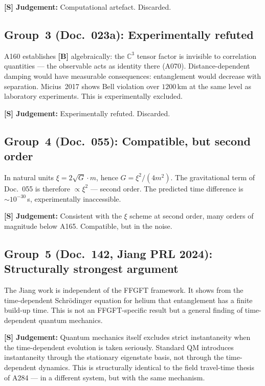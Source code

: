 \textbf{[S] Judgement:} Computational artefact. Discarded.

\subsection{Group~3 (Doc.~023a): Experimentally refuted}

A160 establishes \textbf{[B]} algebraically: the $\mathbb{C}^3$
tensor factor is invisible to correlation quantities --- the observable
acts as identity there (A070). Distance-dependent damping would have
measurable consequences: entanglement would decrease with separation.
Micius~2017 shows Bell violation over $1200$\,km at the same level
as laboratory experiments. This is experimentally excluded.

\textbf{[S] Judgement:} Experimentally refuted. Discarded.

\subsection{Group~4 (Doc.~055): Compatible, but second order}

In natural units $\xi = 2\sqrt{G}\cdot m$, hence $G = \xi^2/(4m^2)$.
The gravitational term of Doc.~055 is therefore $\propto \xi^2$ ---
second order. The predicted time difference is $\sim 10^{-30}$\,s,
experimentally inaccessible.

\textbf{[S] Judgement:} Consistent with the $\xi$ scheme at second order,
many orders of magnitude below A165. Compatible, but in the noise.

\subsection{Group~5 (Doc.~142, Jiang PRL 2024): Structurally strongest argument}

The Jiang work is independent of the FFGFT framework. It shows from the
time-dependent Schrödinger equation for helium that entanglement has a
finite build-up time. This is not an FFGFT-specific result but a general
finding of time-dependent quantum mechanics.

\textbf{[S] Judgement:} Quantum mechanics itself excludes strict
instantaneity when the time-dependent evolution is taken seriously.
Standard QM introduces instantaneity through the stationary eigenstate
basis, not through the time-dependent dynamics. This is structurally
identical to the field travel-time thesis of A284 --- in a different
system, but with the same mechanism.


